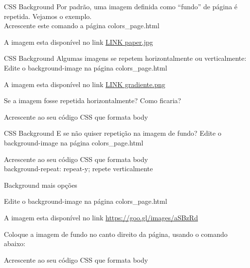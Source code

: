 \documentclass{beamer}
\begin{document}
\begin{frame}{CSS Background}
Por padrão, uma imagem definida como ``fundo'' de página é repetida. Vejamos o exemplo.\\
Acrescente este comando a página colors\_page.html 
	\begin{center}
	 
	\end{center}	 
	A imagem esta disponível no link \href{https://1drv.ms/u/s!AkCRf1UFW3BnjMN39kSRO8ijd5nxLg?e=vfcLWp}{LINK paper.jpg}
\end{frame}
\begin{frame}{CSS Background}
Algumas imagens se repetem horizontalmente ou verticalmente:
Edite o background-image na página colors\_page.html 
	\begin{center}
	 
	\end{center}	 
	A imagem esta disponível no link \href{https://1drv.ms/u/s!AkCRf1UFW3BnjMN106yoqqENJ2lZTQ?e=bQpiFu}{LINK gradiente.png}
	
Se a imagem fosse repetida horizontalmente? Como ficaria?
  \begin{center}
	 
	 \tiny{Acrescente ao seu código CSS que formata body}
	\end{center}
\end{frame}
\begin{frame}{CSS Background}
E se não quiser repetição na imagem de fundo?
Edite o background-image na página colors\_page.html 
\begin{center}
	 
	 \tiny Acrescente ao seu código CSS que formata body\\ 
	 background-repeat: repeat-y; repete verticalmente
	\end{center}
\end{frame}
\begin{frame}{Background mais opções}

Edite o background-image na página colors\_page.html 
	\begin{center}
	 
	\end{center}	 
	A imagem esta disponível no link \href{https://goo.gl/images/aSBzRd}{https://goo.gl/images/aSBzRd}
	
	Coloque a imagem de fundo no canto direito da página, usando o comando abaixo:
\begin{center}
	 
	 \tiny Acrescente ao seu código CSS que formata body\\
	\end{center}
\end{frame}
\end{document}
